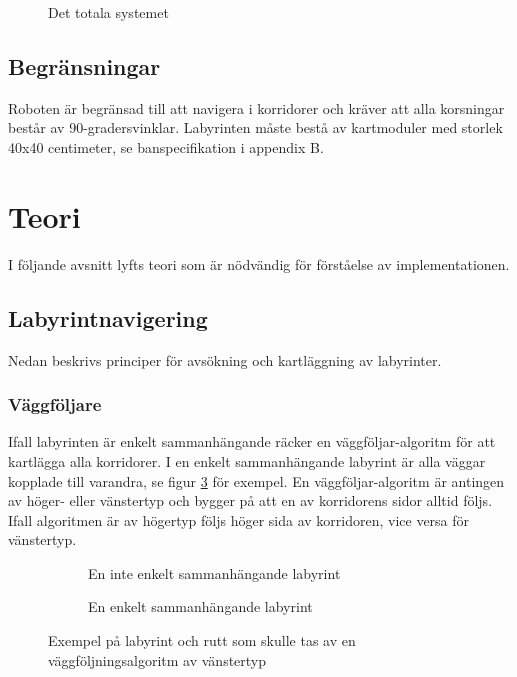 \documentclass[11pt]{article}
\begin{document}
\begin{flushleft}
\begin{figure}[!htbp]
\centering
\noindent\resizebox{\textwidth}{!}{}
\caption{Det totala systemet \label{overview}}
\end{figure}



\subsection{Begränsningar}
Roboten är begränsad till att navigera i korridorer och kräver att alla korsningar består av 90-gradersvinklar. Labyrinten måste bestå av kartmoduler med storlek 40x40 centimeter, se banspecifikation i appendix B.

\pagebreak

\section{Teori}
I följande avsnitt lyfts teori som är nödvändig för förståelse av implementationen.

\subsection{Labyrintnavigering}
Nedan beskrivs principer för avsökning och kartläggning av labyrinter.

\subsubsection{Väggföljare}
Ifall labyrinten är enkelt sammanhängande räcker en väggföljar-algoritm för att kartlägga alla korridorer. I en enkelt sammanhängande labyrint är alla väggar kopplade till varandra, se figur \ref{maze} för exempel. En väggföljar-algoritm är antingen av höger- eller vänstertyp och bygger på att en av korridorens sidor alltid följs. Ifall algoritmen är av högertyp följs höger sida av korridoren, vice versa för vänstertyp.

\begin{figure}[htbp]
	\centering
	\begin{subfigure}{.5\linewidth}
		\centering
		\noindent\resizebox{.5\textwidth}{!}{
			}
		\caption{En inte enkelt sammanhängande labyrint}	
		\label{non-connected}
	\end{subfigure}%
	\begin{subfigure}{.5\linewidth}
		\centering
		\noindent\resizebox{.5\textwidth}{!}{
			}
		\caption{En enkelt sammanhängande labyrint}	
	\end{subfigure}%
	\caption{Exempel på labyrint och rutt som skulle tas av en väggföljningsalgoritm av vänstertyp}
	\label{maze}
\end{figure}%


\end{flushleft}
\end{document}
